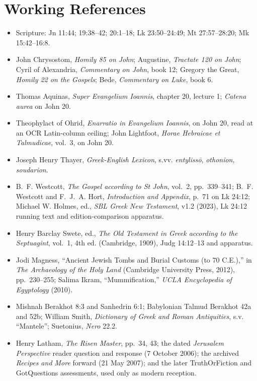 \section{Working References}
\begin{itemize}
\item Scripture: Jn 11:44; 19:38--42; 20:1--18; Lk 23:50--24:49; Mt
27:57--28:20; Mk 15:42--16:8.
\item John Chrysostom, \emph{Homily 85 on John}; Augustine,
\emph{Tractate 120 on John}; Cyril of Alexandria, \emph{Commentary on John},
book 12; Gregory the Great, \emph{Homily 22 on the Gospels}; Bede,
\emph{Commentary on Luke}, book 6.
\item Thomas Aquinas, \emph{Super Evangelium Ioannis}, chapter 20, lecture 1;
\emph{Catena aurea} on John 20.
\item Theophylact of Ohrid, \emph{Enarratio in Evangelium Ioannis}, on John
20, read at an OCR Latin-column ceiling; John Lightfoot, \emph{Horae Hebraicae
et Talmudicae}, vol.~3, on John 20.
\item Joseph Henry Thayer, \emph{Greek-English Lexicon}, s.vv.
\emph{entyliss\=o}, \emph{othonion}, \emph{soudarion}.
\item B.~F. Westcott, \emph{The Gospel according to St John}, vol.~2,
pp.~339--341; B.~F. Westcott and F.~J.~A. Hort, \emph{Introduction and
Appendix}, p.~71 on Lk 24:12; Michael W. Holmes, ed., \emph{SBL Greek New
Testament}, v1.2 (2023), Lk 24:12 running text and edition-comparison
apparatus.
\item Henry Barclay Swete, ed., \emph{The Old Testament in Greek according to
the Septuagint}, vol.~1, 4th ed. (Cambridge, 1909), Judg 14:12--13 and
apparatus.
\item Jodi Magness, ``Ancient Jewish Tombs and Burial Customs (to 70 C.E.),''
in \emph{The Archaeology of the Holy Land} (Cambridge University Press,
2012), pp.~230--255; Salima Ikram,
``Mummification,'' \emph{UCLA Encyclopedia of Egyptology} (2010).
\item Mishnah Berakhot 8:3 and Sanhedrin 6:1; Babylonian Talmud Berakhot
42a and 52b; William Smith, \emph{Dictionary of Greek and Roman Antiquities},
s.v. ``Mantele''; Suetonius, \emph{Nero} 22.2.
\item Henry Latham, \emph{The Risen Master}, pp.~34, 43; the dated
\emph{Jerusalem Perspective} reader question and response (7 October 2006);
the archived \emph{Recipes and More} forward (21 May 2007); and the later
TruthOrFiction and GotQuestions assessments, used only as modern reception.
\end{itemize}


